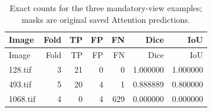 \small
\begin{longtable}{lrrrrrr}
\caption{Exact counts for the three mandatory-view examples; masks are original saved Attention predictions.}\\
\toprule
Image & Fold & TP & FP & FN & Dice & IoU\\\midrule
\endfirsthead
\toprule
Image & Fold & TP & FP & FN & Dice & IoU\\\midrule
\endhead
128.tif & 3 & 21 & 0 & 0 & 1.000000 & 1.000000\\
493.tif & 5 & 20 & 4 & 1 & 0.888889 & 0.800000\\
1068.tif & 4 & 0 & 4 & 629 & 0.000000 & 0.000000\\
\bottomrule\end{longtable}\normalsize
